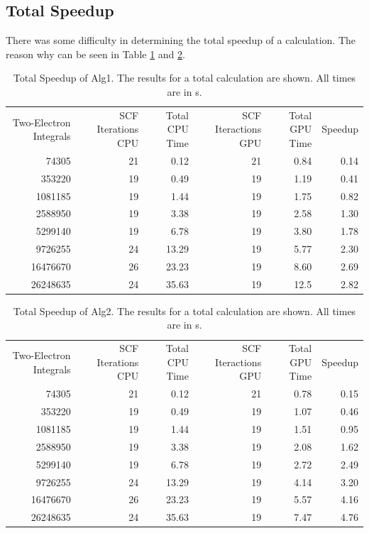 \documentclass[12pt]{report}
\begin{document}
\subsection{Total Speedup}
There was some difficulty in determining the total speedup of a calculation. The reason why can be seen in Table \ref{tab:totalprofalg1} and \ref{tab:totalprofalg2}.

\begin{table}[h!]
\caption[Total Speedup of Alg1]{Total Speedup of Alg1. The results for a total calculation are shown. All times are in s.}
\label{tab:totalprofalg1}
\begin{tabular}{rrrrrr}
	\multirow{2}{3cm}{Two-Electron Integrals}	&	\multirow{2}{3cm}{SCF Iterations CPU}	&	\multirow{2}{2cm}{Total CPU Time}		&	\multirow{2}{3cm}{SCF Iteractions GPU}		&	\multirow{2}{2cm}{Total GPU Time}		&	\multirow{2}{*}{Speedup}	\\
	\\
	\hline
	74305	&	21	&	0.12		&	21	&	0.84	&	0.14	\\
	353220	&	19	&	0.49		&	19	&	1.19	&	0.41	\\
	1081185	&	19	&	1.44		&	19	&	1.75	&	0.82	\\
	2588950	&	19	&	3.38		&	19	&	2.58	&	1.30	\\
	5299140	&	19	&	6.78		&	19	&	3.80	&	1.78	\\
	9726255	&	24	&	13.29	&	19	&	5.77	&	2.30	\\
	16476670	&	26	&	23.23	&	19	&	8.60	&	2.69	\\
	26248635	&	24	&	35.63	&	19	&	12.5	&	2.82	\\
\end{tabular}
\end{table}

\begin{table}[h!]
\caption[Total Speedup of Alg2]{Total Speedup of Alg2. The results for a total calculation are shown. All times are in s.}
\label{tab:totalprofalg2}
\begin{tabular}{rrrrrr}
	\multirow{2}{3cm}{Two-Electron Integrals}	&	\multirow{2}{3cm}{SCF Iterations CPU}	&	\multirow{2}{2cm}{Total CPU Time}		&	\multirow{2}{3cm}{SCF Iteractions GPU}		&	\multirow{2}{2cm}{Total GPU Time}		&	\multirow{2}{*}{Speedup}	\\
	\\
	\hline
	74305	&	21	&	0.12		&	21	&	0.78	&	0.15	\\
	353220	&	19	&	0.49		&	19	&	1.07	&	0.46	\\
	1081185	&	19	&	1.44		&	19	&	1.51	&	0.95	\\
	2588950	&	19	&	3.38		&	19	&	2.08	&	1.62	\\
	5299140	&	19	&	6.78		&	19	&	2.72	&	2.49	\\
	9726255	&	24	&	13.29	&	19	&	4.14	&	3.20	\\
	16476670	&	26	&	23.23	&	19	&	5.57	&	4.16	\\
	26248635	&	24	&	35.63	&	19	&	7.47	&	4.76	\\
\end{tabular}
\end{table}
\end{document}
